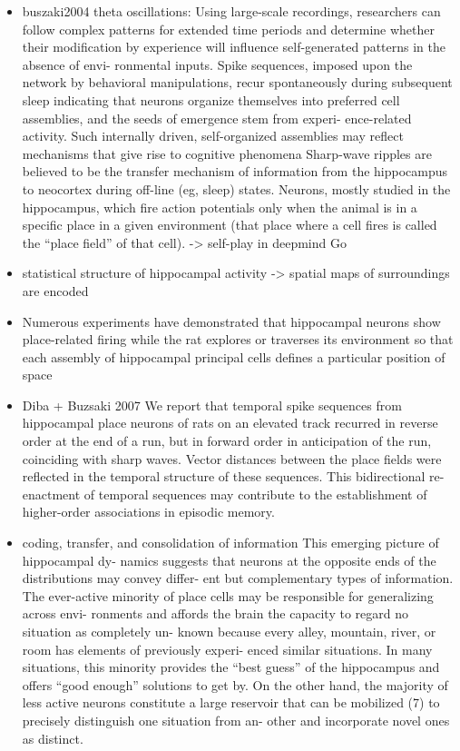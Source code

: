 \documentclass{article} %
\begin{document}
\begin{itemize}
\begin{itemize}
\item
buszaki2004 theta oscillations:
Using large-scale recordings, researchers can follow complex patterns for extended time periods and determine whether their modification by experience will influence self-generated patterns in the absence of envi- ronmental inputs. Spike sequences, imposed upon the network by behavioral manipulations, recur spontaneously during subsequent sleep
indicating that neurons organize themselves into preferred cell assemblies, and the seeds of emergence stem from experi- ence-related activity.
 Such internally driven, self-organized assemblies may reflect mechanisms that give rise to cognitive phenomena
 Sharp-wave ripples are believed to be the transfer mechanism of information from the hippocampus to neocortex during off-line (eg, sleep) states.
Neurons, mostly studied in the hippocampus, which fire action potentials only when the animal is in a specific place in a given environment (that place where a cell fires is called the “place field” of that cell).
-> self-play in deepmind Go

\item
statistical structure of hippocampal activity ->
spatial maps of surroundings are encoded

\item
Numerous experiments have demonstrated that hippocampal neurons show place-related firing while the rat explores or traverses its environment so that each assembly of hippocampal principal cells defines a particular position of space 

\item
Diba + Buzsaki 2007
We report that temporal spike sequences from hippocampal place neurons of rats on an elevated track recurred in reverse order at the end of a run, but in forward order in anticipation of the run, coinciding with sharp waves. Vector distances between the place fields were reflected in the temporal structure of these sequences. This bidirectional re-enactment of temporal sequences may contribute to the establishment of higher-order associations in episodic memory.

\item
coding, transfer, and consolidation of
information
This emerging picture of hippocampal dy- namics suggests that neurons at the opposite ends of the distributions may convey differ- ent but complementary types of information. The ever-active minority of place cells may be responsible for generalizing across envi- ronments and affords the brain the capacity to regard no situation as completely un- known because every alley, mountain, river, or room has elements of previously experi- enced similar situations. In many situations,
this minority provides the “best guess” of the hippocampus and offers “good enough” solutions to get by. On the other hand, the majority of less active neurons constitute a large reservoir that can be mobilized (7) to precisely distinguish one situation from an- other and incorporate novel ones as distinct.



\end{itemize}
\end{itemize}
\end{document}
